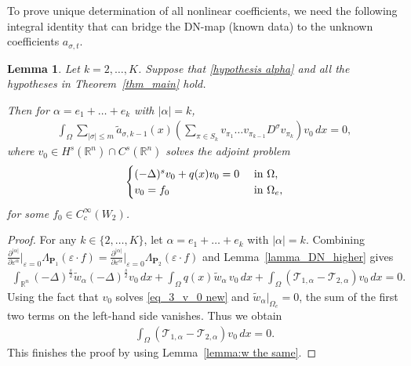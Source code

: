 \documentclass [oneside,11pt] {amsart}
\numberwithin{equation}{section}
\newtheorem{lemma}{Lemma}[section]
\newcommand{\R}{\mathbb{R}}
\newcommand{\p}{\partial}
\newcommand{\dx}{\,dx}
\newcommand{\LC}{\left(}
\newcommand{\RC}{\right)}
\begin{document}
To prove unique determination of all nonlinear coefficients, we need the following integral identity that can bridge the DN-map (known data) to the unknown coefficients $a_{\sigma, t}$.
\begin{lemma}\label{lemma_Integral identity}
Let $k=2,\ldots, K$. Suppose that \eqref{hypothesis alpha} and all the hypotheses in Theorem~\ref{thm_main} hold. 

Then for $\alpha=e_{1}+\ldots+e_{k}$ with $|\alpha|=k$,
\begin{align}\label{ID:integral identity higher-order new}
\int_\Omega \sum_{|\sigma|\le m} \widetilde{a}_{\sigma,k-1}(x)\LC \sum_{\pi\in S_k} v_{\pi_1}\ldots v_{\pi_{k-1}}D^\sigma v_{\pi_k}\RC v_0 \dx = 0,
\end{align}
where
$v_0\in H^s(\R^n)\cap C^{s}(\R^n)$ solves the adjoint problem
\begin{equation}\label{eq_3_v_0 new}
\begin{aligned}
\begin{cases}
(-\Delta)^s v_0 +   q(x)  v_0  =0 &\hbox{ in } \Omega,\\
v_0 = f_{0} &\hbox{ in } \Omega_e,
\end{cases}
\end{aligned}
\end{equation}
for some $f_0\in C^\infty_c(W_2)$. 
\end{lemma}
\begin{proof}

For any $k\in \{2,\ldots, K\}$, let  $\alpha=e_{1}+\ldots+e_{k}$ with $|\alpha|=k$. 
Combining 
$\frac{\p^{|\alpha|}}{\p \varepsilon^\alpha}\big|_{\varepsilon=0}\Lambda_{\mathbf{P}_1}(\varepsilon\cdot f)
=\frac{\p^{|\alpha|}}{\p \varepsilon^\alpha}\big|_{\varepsilon=0}\Lambda_{\mathbf{P}_2}(\varepsilon\cdot f)$ and Lemma~\ref{lamma_DN_higher} gives
\begin{align*}
 \int_{\R^n} (-\Delta)^{\frac{s}{2}}\widetilde{w}_\alpha(-\Delta)^{\frac{s}{2}} v_0\dx + \int_\Omega q(x)\widetilde{w}_\alpha\, v_0 \dx+ \int_{\Omega}(\mathcal{T}_{1,\alpha}-\mathcal{T}_{2,\alpha})v_0\dx=0.
\end{align*}
Using the fact that $v_0$ solves \eqref{eq_3_v_0 new} and $\widetilde{w}_\alpha|_{\Omega_e}=0$, the sum of the first two terms on the left-hand side vanishes. Thus we obtain 
\begin{align*}
\int_{\Omega}(\mathcal{T}_{1,\alpha}-\mathcal{T}_{2,\alpha})v_0\dx=0.
\end{align*}
This finishes the proof by using Lemma~\ref{lemma:w the same}.
\end{proof}
\end{document}
